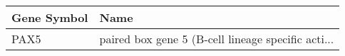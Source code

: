 \begin{tabular}{ll}
\toprule
Gene Symbol &                                               Name \\
\midrule
       PAX5 & paired box gene 5 (B-cell lineage specific acti... \\
\bottomrule
\end{tabular}
